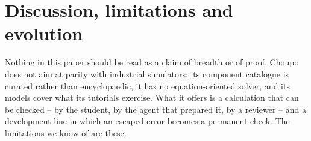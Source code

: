 \documentclass[11pt,a4paper]{article}
\begin{document}

\FloatBarrier
\section{Discussion, limitations and evolution}
\label{sec:limits}

Nothing in this paper should be read as a claim of breadth or of proof.
Choupo does not aim at parity with industrial simulators: its component
catalogue is curated rather than encyclopaedic, it has no equation-oriented
solver, and its models cover what its tutorials exercise.  What it offers
is a calculation that can be checked -- by the student, by the agent that
prepared it, by a reviewer -- and a development line in which an escaped
error becomes a permanent check.  The limitations we know of are these.
\end{document}
